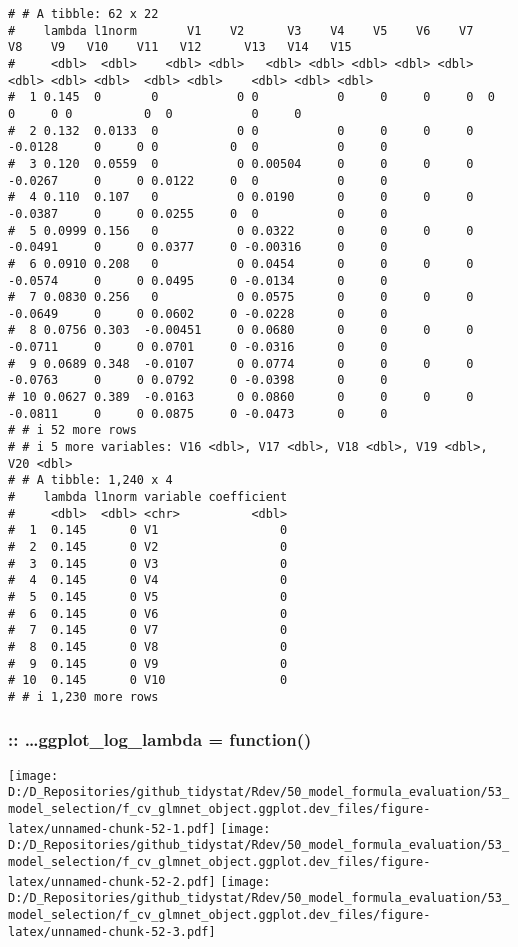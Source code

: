 \documentclass[
]{article}
\begin{document}
\begin{verbatim}
# # A tibble: 62 x 22
#    lambda l1norm       V1    V2      V3    V4    V5    V6    V7      V8    V9   V10    V11   V12      V13   V14   V15
#     <dbl>  <dbl>    <dbl> <dbl>   <dbl> <dbl> <dbl> <dbl> <dbl>   <dbl> <dbl> <dbl>  <dbl> <dbl>    <dbl> <dbl> <dbl>
#  1 0.145  0       0           0 0           0     0     0     0  0          0     0 0          0  0           0     0
#  2 0.132  0.0133  0           0 0           0     0     0     0 -0.0128     0     0 0          0  0           0     0
#  3 0.120  0.0559  0           0 0.00504     0     0     0     0 -0.0267     0     0 0.0122     0  0           0     0
#  4 0.110  0.107   0           0 0.0190      0     0     0     0 -0.0387     0     0 0.0255     0  0           0     0
#  5 0.0999 0.156   0           0 0.0322      0     0     0     0 -0.0491     0     0 0.0377     0 -0.00316     0     0
#  6 0.0910 0.208   0           0 0.0454      0     0     0     0 -0.0574     0     0 0.0495     0 -0.0134      0     0
#  7 0.0830 0.256   0           0 0.0575      0     0     0     0 -0.0649     0     0 0.0602     0 -0.0228      0     0
#  8 0.0756 0.303  -0.00451     0 0.0680      0     0     0     0 -0.0711     0     0 0.0701     0 -0.0316      0     0
#  9 0.0689 0.348  -0.0107      0 0.0774      0     0     0     0 -0.0763     0     0 0.0792     0 -0.0398      0     0
# 10 0.0627 0.389  -0.0163      0 0.0860      0     0     0     0 -0.0811     0     0 0.0875     0 -0.0473      0     0
# # i 52 more rows
# # i 5 more variables: V16 <dbl>, V17 <dbl>, V18 <dbl>, V19 <dbl>, V20 <dbl>
# # A tibble: 1,240 x 4
#    lambda l1norm variable coefficient
#     <dbl>  <dbl> <chr>          <dbl>
#  1  0.145      0 V1                 0
#  2  0.145      0 V2                 0
#  3  0.145      0 V3                 0
#  4  0.145      0 V4                 0
#  5  0.145      0 V5                 0
#  6  0.145      0 V6                 0
#  7  0.145      0 V7                 0
#  8  0.145      0 V8                 0
#  9  0.145      0 V9                 0
# 10  0.145      0 V10                0
# # i 1,230 more rows
\end{verbatim}

\hypertarget{ggplot_log_lambda-function}{%
\subsubsection{:: \ldots ggplot\_log\_lambda =
function()}\label{ggplot_log_lambda-function}}

\texttt{[image: D:/D\_Repositories/github\_tidystat/Rdev/50\_model\_formula\_evaluation/53\_model\_selection/f\_cv\_glmnet\_object.ggplot.dev\_files/figure-latex/unnamed-chunk-52-1.pdf]}
\texttt{[image: D:/D\_Repositories/github\_tidystat/Rdev/50\_model\_formula\_evaluation/53\_model\_selection/f\_cv\_glmnet\_object.ggplot.dev\_files/figure-latex/unnamed-chunk-52-2.pdf]}
\texttt{[image: D:/D\_Repositories/github\_tidystat/Rdev/50\_model\_formula\_evaluation/53\_model\_selection/f\_cv\_glmnet\_object.ggplot.dev\_files/figure-latex/unnamed-chunk-52-3.pdf]}
\end{document}
